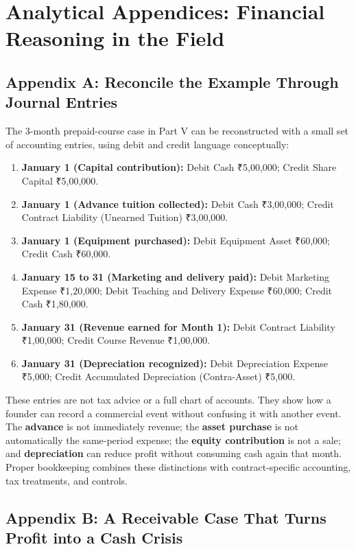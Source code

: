\section*{Analytical Appendices: Financial Reasoning in the Field}

\subsection*{Appendix A: Reconcile the Example Through Journal Entries}

The 3-month prepaid-course case in Part V can be reconstructed with a small set of accounting entries, using debit and credit language conceptually:
\begin{enumerate}
  \item \textbf{January 1 (Capital contribution):} Debit Cash ₹5,00,000; Credit Share Capital ₹5,00,000.
  \item \textbf{January 1 (Advance tuition collected):} Debit Cash ₹3,00,000; Credit Contract Liability (Unearned Tuition) ₹3,00,000.
  \item \textbf{January 1 (Equipment purchased):} Debit Equipment Asset ₹60,000; Credit Cash ₹60,000.
  \item \textbf{January 15 to 31 (Marketing and delivery paid):} Debit Marketing Expense ₹1,20,000; Debit Teaching and Delivery Expense ₹60,000; Credit Cash ₹1,80,000.
  \item \textbf{January 31 (Revenue earned for Month 1):} Debit Contract Liability ₹1,00,000; Credit Course Revenue ₹1,00,000.
  \item \textbf{January 31 (Depreciation recognized):} Debit Depreciation Expense ₹5,000; Credit Accumulated Depreciation (Contra-Asset) ₹5,000.
\end{enumerate}

These entries are not tax advice or a full chart of accounts. They show how a founder can record a commercial event without confusing it with another event. The \textbf{advance} is not immediately revenue; the \textbf{asset purchase} is not automatically the same-period expense; the \textbf{equity contribution} is not a sale; and \textbf{depreciation} can reduce profit without consuming cash again that month. Proper bookkeeping combines these distinctions with contract-specific accounting, tax treatments, and controls.

\subsection*{Appendix B: A Receivable Case That Turns Profit into a Cash Crisis}

